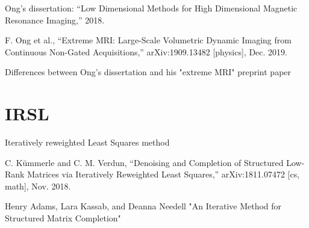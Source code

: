 Ong's dissertation: “Low Dimensional Methods for High Dimensional Magnetic Resonance Imaging,” 2018.

F. Ong et al., “Extreme MRI: Large-Scale Volumetric Dynamic Imaging from Continuous Non-Gated Acquisitions,” arXiv:1909.13482 [physics], Dec. 2019.

Differences between Ong's dissertation and his "extreme MRI" preprint paper

\section{IRSL}
Iteratively reweighted Least Squares method

C. Kümmerle and C. M. Verdun, “Denoising and Completion of Structured Low-Rank Matrices via Iteratively Reweighted Least Squares,” arXiv:1811.07472 [cs, math], Nov. 2018.

Henry Adams, Lara Kassab, and Deanna Needell "An Iterative Method for Structured Matrix Completion"

\clearpage %